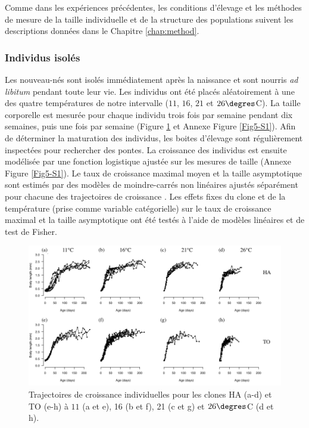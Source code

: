 Comme dans les expériences précédentes, les conditions d'élevage et les méthodes
de mesure de la taille individuelle et de la structure des populations suivent
les descriptions données dans le Chapitre \ref{chap:method}.

\subsubsection{Individus isolés}

Les nouveau-nés sont isolés immédiatement après la naissance et sont nourris
\textit{ad libitum} pendant toute leur vie. Les individus ont été placés
aléatoirement à une des quatre températures de notre intervalle ($11$, $16$,
$21$ et $26\degres$C). La taille corporelle est mesurée pour chaque individu
trois fois par semaine pendant dix semaines, puis une fois par semaine (Figure
\ref{fig:FIP1} et Annexe Figure \ref{Fig5-S1}). Afin de déterminer la maturation
des individus, les boites d'élevage sont régulièrement inspectées pour
rechercher des pontes. La croissance des individus est ensuite modélisée par une
fonction logistique ajustée sur les mesures de taille (Annexe Figure 
\ref{Fig5-S1}). Le taux de croissance maximal moyen et la taille asymptotique
sont estimés par des modèles de moindre-carrés non linéaires ajustés séparément
pour chacune des trajectoires de croissance \autocites{pinheiro2000a}. Les
effets fixes du clone et de la température (prise comme variable catégorielle)
sur le taux de croissance maximal et la taille asymptotique ont été testés à
l'aide de modèles linéaires et de test de Fisher.

\begin{figure}[!ht]
\begin{center}
\includegraphics[width=\textwidth]{1_CorpsDeThese/Resumes/Fig/FIP01}
\caption[Trajectoires de croissance
individuelles]{Trajectoires de croissance individuelles pour les clones HA
(a-d) et TO (e-h) à $11$ (a et e), 16 (b et f), 21 (c et g) et
$26\degres$C (d et h).}
\label{fig:FIP1}
\end{center}
\end{figure}


